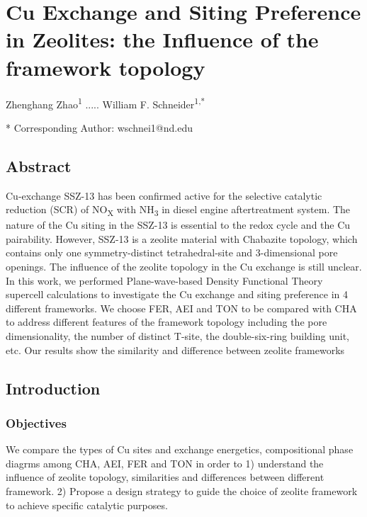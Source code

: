 \documentclass[12pt]{article}
\begin{document}
\section*{Cu Exchange and Siting Preference in Zeolites: the Influence of the framework topology}

Zhenghang Zhao\textsuperscript{1} ..... William F. Schneider\textsuperscript{1,*}

{\small
{}
* Corresponding Author: wschnei1@nd.edu 
}                     
 
\subsection*{Abstract}

Cu-exchange SSZ-13 has been confirmed active for the selective catalytic reduction (SCR) of NO\textsubscript{X} with NH\textsubscript{3} in diesel engine aftertreatment system. The nature of the Cu siting in the SSZ-13 is essential to the redox cycle and the Cu pairability. However, SSZ-13 is a zeolite material with Chabazite topology, which contains only one symmetry-distinct tetrahedral-site and 3-dimensional pore openings. The influence of the zeolite topology in the Cu exchange is still unclear. In this work, we performed Plane-wave-based Density Functional Theory supercell calculations to investigate the Cu exchange and siting preference in 4 different frameworks. We choose FER, AEI and TON to be compared with CHA to address different features of the framework topology including the pore dimensionality, the number of distinct T-site, the double-six-ring building unit, etc. Our results show the similarity and difference between zeolite frameworks

\subsection*{Introduction}
\subsubsection*{Objectives}
We compare the types of Cu sites and exchange energetics, compositional phase diagrms among CHA, AEI, FER and TON in order to 1) understand the influence of zeolite topology, similarities and differences between different framework. 2) Propose a design strategy to guide the choice of zeolite framework to achieve specific catalytic purposes.
\end{document}
